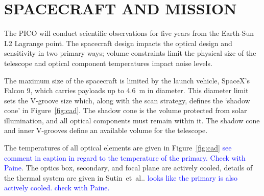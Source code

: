 \documentclass[]{spie}  %
\newcommand{\comb}[1]{\textcolor{blue}{#1}}
\begin{document}

\section{SPACECRAFT AND MISSION}
\label{sec:spacecraft}


The PICO will conduct scientific observations for five years from the Earth-Sun L2 Lagrange point. The spacecraft design impacts 
the optical design and sensitivity in two primary ways; volume constraints limit the physical size of the telescope and optical component 
temperatures impact noise levels.  

The maximum size of the spacecraft is limited by the launch vehicle, SpaceX's Falcon 9, which carries payloads up to 4.6~m in diameter. 
This diameter limit sets the V-groove size which, along with the scan strategy, defines the `shadow cone' in Figure~\ref{fig:cad}.  
The shadow cone is the volume protected from solar illumination, and all optical components must remain within it. The shadow cone and 
inner V-grooves define an available volume for the telescope.  

The temperatures of all optical elements are given in Figure~\ref{fig:cad} \comb{see comment in caption in regard to the temperature 
of the primary. Check with Paine}.  The optics box, secondary, and focal plane are actively cooled, 
details of the thermal system are given in Sutin~et~al.\cite{brian_spie}. \comb{looks like the primary is also actively 
cooled. check with Paine.}
\end{document}
